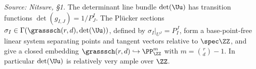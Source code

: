 \begin{lemma}
  \label{lem:grassmannian-very-ample}
  \textit{Source: Nitsure, §1.}
  The determinant line bundle $\det(\Uu)$ has transition functions
  $\det(g_{I,J}) = 1/P^I_J$. The Pl\"ucker sections $\sigma_I\in
  \Gamma(\grasssch(r,d),\det(\Uu))$, defined by
  $\sigma_I|_{U^J} = P^J_I$, form a base-point-free linear system separating
  points and tangent vectors relative to $\spec\ZZ$, and give a closed embedding
  $\grasssch(r,d)\hookrightarrow\PP^m_{\ZZ}$ with $m = \binom{r}{d}-1$. In
  particular $\det(\Uu)$ is relatively very ample over $\ZZ$.
\end{lemma}

